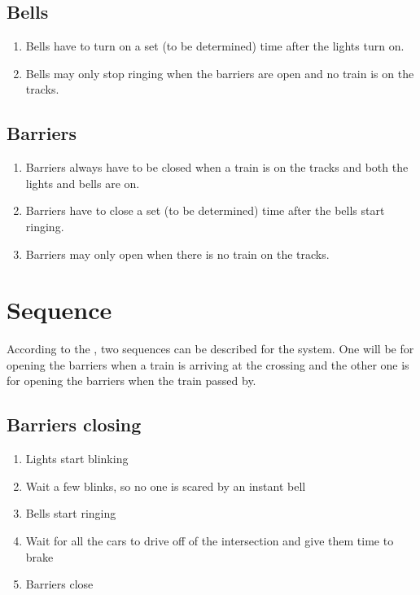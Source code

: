 \documentclass[final]{report}
\begin{document}
\subsection{Bells}
	\begin{enumerate}
		\item Bells have to turn on a set (to be determined) time after the lights turn on.
		\item Bells may only stop ringing when the barriers are open and no train is on the tracks.
	\end{enumerate}

\subsection{Barriers}
	\begin{enumerate}
		\item Barriers always have to be closed when a train is on the tracks and both the lights and bells are on.
		\item Barriers have to close a set (to be determined) time after the bells start ringing.
		\item Barriers may only open when there is no train on the tracks.
	\end{enumerate}


\section{Sequence}
According to the , two sequences can be described for the system.
One will be for opening the barriers when a train is arriving at the crossing and the other one is for opening the barriers when the train passed by.

\subsection{Barriers closing}
\begin{enumerate}
\item Lights start blinking
\item Wait a few blinks, so no one is scared by an instant bell
\item Bells start ringing
\item Wait for all the cars to drive off of the intersection and give them time to brake
\item Barriers close
\end{enumerate}
\end{document}
